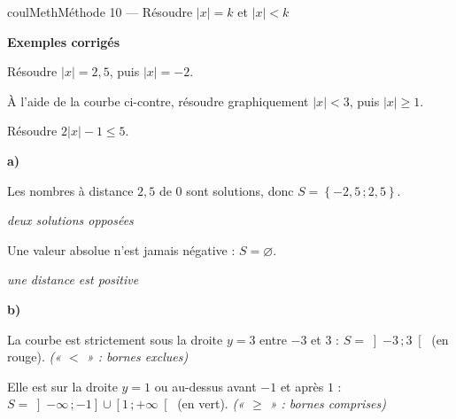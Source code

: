 \documentclass[11pt,a4paper]{article}
\makeatletter
\renewcommand{\le}{\leqslant}
\renewcommand{\ge}{\geqslant}
\newcommand{\lycee@repere}[4]{%
  \draw[grille,step=1] (#1,#2) grid (#3,#4);
  \draw[-{Stealth[length=2mm]},thick] (#1,0)--({#3+0.4},0) node[below left=-1pt]{$x$};
  \draw[-{Stealth[length=2mm]},thick] (0,#2)--(0,{#4+0.4}) node[below left=-1pt]{$y$};
  \node[below left,font=\scriptsize,inner sep=1.5pt] at (0,0) {$0$};}
\newcommand{\lycee@gradx}[1]{\foreach \k/\l in {#1}{%
  \draw (\k,0.07)--(\k,-0.07) node[below,font=\scriptsize,inner sep=1.5pt]{$\l$};}}
\newcommand{\lycee@grady}[1]{\foreach \k/\l in {#1}{%
  \draw (0.07,\k)--(-0.07,\k) node[left,font=\scriptsize,inner sep=1.5pt]{$\l$};}}
\newcommand{\lycee@intfo}[2]{\left[#1\,;#2\right[}
\newcommand{\lycee@intof}[2]{\left]#1\,;#2\right]}
\newcommand{\lycee@intoo}[2]{\left]#1\,;#2\right[}
\newcommand{\lycee@ens}[1]{\left\{#1\right\}}
\providecommand{\repere}{\lycee@repere}%
\providecommand{\gradx}{\lycee@gradx}%
\providecommand{\grady}{\lycee@grady}%
\providecommand{\intfo}{\lycee@intfo}%
\providecommand{\intof}{\lycee@intof}%
\providecommand{\intoo}{\lycee@intoo}%
\providecommand{\ens}{\lycee@ens}}
\newcounter{lycee@signet}
\newcommand{\signet}[3][]{\stepcounter{lycee@signet}%
  \edef\lycee@dest{\if\relax\detokenize{#1}\relax
    signet.\arabic{lycee@signet}\else#1\fi}%
  \hypertarget{\lycee@dest}{}\bookmark[level=#2,dest=\lycee@dest]{#3}}
\newcommand{\res}[1]{#1}
\newcounter{methode}
\newenvironment{methodebox}[1][Méthode]{\stepcounter{methode}%
  \begin{boitecours}[phantom={\signet[methode-\arabic{methode}]{2}{#1}}]{coulMeth}{#1}}%
  {\end{boitecours}}
\newcommand{\etape}[1]{\par\smallskip\textbf{\color{coulMeth}#1}\par\nobreak\smallskip}
\newcommand{\explique}[2]{\par\smallskip\noindent
  \begin{minipage}[t]{0.57\linewidth}\raggedright #1\end{minipage}\hfill
  \begin{minipage}[t]{0.40\linewidth}\raggedright\leavevmode
    {\small\itshape\color{black!60}#2}\end{minipage}\par}
\newcommand{\cas}[1]{\par\smallskip\noindent\textbf{\color{coulExo}#1}\vadjust{\nobreak}}
\newenvironment{correction}{\par}{\par}
\newcommand{\etapeexemples}{\etape{Exemples corrigés}}
\makeatother
\begin{document}
\begin{methodebox}[Méthode 10 --- Résoudre $|x|=k$ et $|x|<k$]
\etapeexemples
\begin{minipage}[c]{0.60\linewidth}\raggedright
\begin{questions}[label=\alph*)]
  \item Résoudre $|x|=2{,}5$, puis $|x|=-2$.
  \item À l'aide de la courbe ci-contre, résoudre graphiquement $|x|<3$, puis $|x|\ge 1$.
  \item Résoudre $2|x|-1\le 5$.
\end{questions}
\end{minipage}\hfill
\begin{minipage}[c]{0.36\linewidth}\centering
{}
\end{minipage}
\begin{correction}
\cas{a)}
\explique{Les nombres à distance $2{,}5$ de $0$ sont solutions, donc $S=\res{\ens{-2{,}5\,;2{,}5}}$.}{deux
solutions opposées}
\explique{Une valeur absolue n'est jamais négative : $S=\res{\varnothing}$.}{une distance est
positive}
\cas{b)}\par\nopagebreak
\begin{minipage}[c]{0.60\linewidth}\raggedright
La courbe est strictement sous la droite $y=3$ entre $-3$ et $3$ :
${S=\res{\intoo{-3}{3}}}$ (en rouge). {\small\itshape\color{black!60}(« $<$ » : bornes exclues)}

\smallskip

Elle est sur la droite $y=1$ ou au-dessus avant $-1$ et après $1$ :
${S=\res{\intof{-\infty}{-1}\cup\intfo{1}{+\infty}}}$ (en vert). {\small\itshape\color{black!60}(« $\ge$ » : bornes
comprises)}

\smallskip


\end{minipage}
\end{correction}
\end{methodebox}
\end{document}
